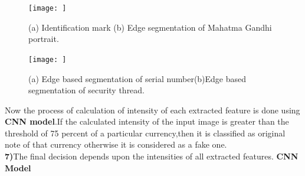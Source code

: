 \begin{figure}[h!]
	\centering
	\texttt{[image: ]}
	\caption{(a) Identification mark (b) Edge segmentation of Mahatma Gandhi portrait.}
\end{figure}
\newpage
\begin{figure}[h!]
	\centering
	\texttt{[image: ]}
	\caption{(a) Edge based segmentation of serial number(b)Edge based segmentation of security thread.}
\end{figure}
\vspace*{1cm}
\newline
{} Now the process of calculation of intensity of each extracted feature is done using {\bf CNN model}.If the calculated intensity of the input image is greater than the threshold of 75 percent of a particular currency,then it is classified as original note of that currency otherwise it is considered as a fake one.\\
{\bf 7)}The final decision depends upon the intensities of all extracted features.
\newpage
\noindent\textbf{CNN Model}\\

